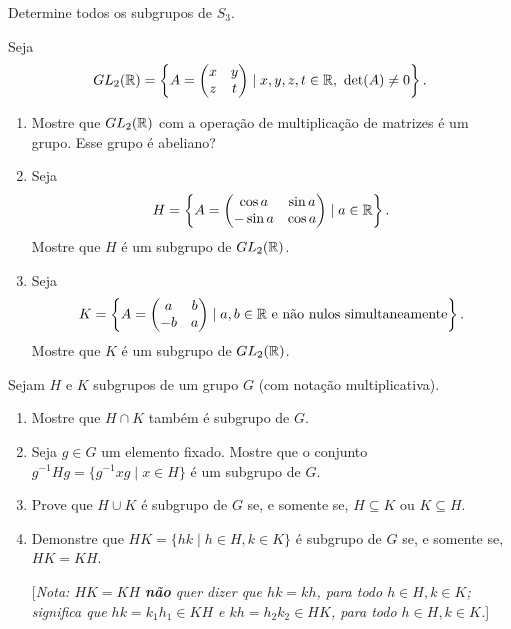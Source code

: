 \documentclass[12pt]{exam}
\begin{document}
    \questao{} Determine todos os subgrupos de $S_3$.

    \vspace{.3cm}

    \questao{} Seja
    \[
      GL_2(\mathbb{R}) = \left\{A = \begin{pmatrix}
          x & y\\z & t
      \end{pmatrix} \mid x, y, z, t \in \mathbb{R},\ \det(A) \ne 0\right\}.
    \]
    \begin{enumerate}[label=({\alph*})]
      \item Mostre que $GL_2(\mathbb{R})$ com a opera\c{c}\~ao de multiplica\c{c}\~ao de matrizes \'e um grupo. Esse grupo \'e abeliano?

      \item Seja
      \[
          H = \left\{ A = \begin{pmatrix}
              \cos a & \sin a\\ -\sin a & \cos a
          \end{pmatrix} \mid a \in \mathbb{R}\right\}.
      \]
      Mostre que $H$ \'e um subgrupo de $GL_2(\mathbb{R})$.

      \item Seja
      \[
          K = \left\{ A = \begin{pmatrix}
              a & b\\ -b & a
          \end{pmatrix} \mid a, b \in \mathbb{R} \mbox{ e n\~ao nulos simultaneamente}\right\}.
      \]
      Mostre que $K$ \'e um subgrupo de $GL_2(\mathbb{R})$.
    \end{enumerate}

    \questao{} Sejam $H$ e $K$ subgrupos de um grupo $G$ (com nota{\c c}{\~a}o
    multiplicativa).
    \begin{enumerate}[label=({\alph*})]
      \item Mostre que $H\cap K$ tamb{\'e}m {\'e} subgrupo de $G$.
      
      \item Seja $g\in G$ um elemento fixado. Mostre que o conjunto
      $g^{-1}Hg=\{ g^{-1}xg \mid x\in H \} $ {\'e} um subgrupo de $G$.
      
      \item Prove que $H\cup K$ {\'e} subgrupo de $G$ se, e somente se,
      $H\subseteq K$ ou $K\subseteq H$.
      
      \item Demonstre que $HK=\{hk \mid h\in H, k\in K\}$ {\'e} subgrupo
      de $G$ se, e somente se, $HK=KH$.

      [\emph{Nota: $HK=KH$ \textbf{n{\~a}o} quer dizer que $hk=kh$,
      para todo $h\in H, k\in K$; significa que $hk=k_1h_1 \in KH$ e $kh=h_2k_2 \in
      HK$, para todo $h\in H, k\in K$.}]
    \end{enumerate}
\end{document}
